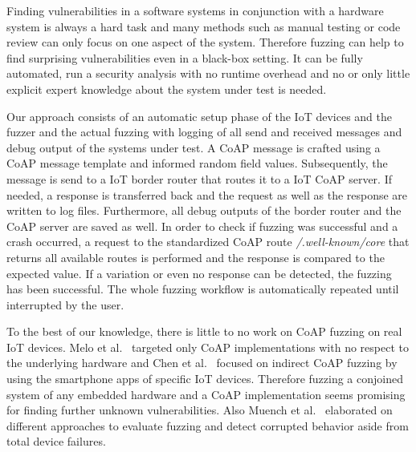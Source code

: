 Finding vulnerabilities in a software systems in conjunction with a hardware system is always a hard task and many methods such as manual testing or code review can only focus on one aspect of the system. Therefore fuzzing can help to find surprising vulnerabilities even in a black-box setting. It can be fully automated, run a security analysis with no runtime overhead and no or only little explicit expert knowledge about the system under test is needed.

Our approach consists of an automatic setup phase of the IoT devices and the fuzzer and the actual fuzzing with logging of all send and received messages and debug output of the systems under test. A CoAP message is crafted using a CoAP message template and informed random field values. Subsequently, the message is send to a IoT border router that routes it to a IoT CoAP server. If needed, a response is transferred back and the request as well as the response are written to log files. Furthermore, all debug outputs of the border router and the CoAP server are saved as well. In order to check if fuzzing was successful and a crash occurred, a request to the standardized CoAP route \textit{/.well-known/core} that returns all available routes is performed and the response is compared to the expected value. If a variation or even no response can be detected, the fuzzing has been successful. The whole fuzzing workflow is automatically repeated until interrupted by the user.

To the best of our knowledge, there is little to no work on CoAP fuzzing on real IoT devices. Melo et al.~\cite{Melo2017RobustnessTO} targeted only CoAP implementations with no respect to the underlying hardware and Chen et al.~\cite{chen2018ndss} focused on indirect CoAP fuzzing by using the smartphone apps of specific IoT devices. Therefore fuzzing a conjoined system of any embedded hardware and a CoAP implementation seems promising for finding further unknown vulnerabilities. Also Muench et al.~\cite{EURECOM+5417} elaborated on different approaches to evaluate fuzzing and detect corrupted behavior aside from total device failures.